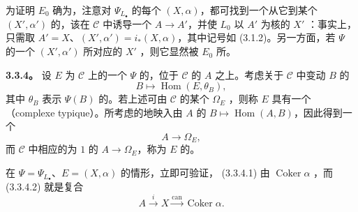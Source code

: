 为证明 $E_0$ 确为，注意对 $\Psi_{L_\bullet}$ 的每个 $(X,\alpha)$，都可找到一个从它到某个 $(X',\alpha')$ 的，该在 $\mathcal C$ 中诱导一个 $A\to A'$，并使 $L_0$ 以 $A'$ 为核的 $X'$ ：事实上，只需取 $A'=X$、$(X',\alpha')=i_*(X,\alpha)$，其中记号如 (3.1.2)。另一方面，若 $\Psi$ 的一个 $(X',\alpha')$ 所对应的 $X'$ ，则它显然被 $E_0$ 所。

\textbf{3.3.4。} 设 $E$ 为 $\mathcal C$ 上的一个 $\Psi$ 的，位于 $\mathcal C$ 的 $A$ 之上。考虑关于 $\mathcal C$ 中变动 $B$ 的
\[
B\longmapsto\operatorname{Hom}(E,\theta_B),\tag{3.3.4.1}
\]
其中 $\theta_B$ 表示 $\Psi(B)$ 的。若上述可由 $\mathcal C$ 的某个 $\Omega_E$ ，则称 $E$ 具有一个（complexe typique）。所考虑的地映入由 $A$ 的 $B\mapsto\operatorname{Hom}(A,B)$，因此得到一个
\[
A\longrightarrow\Omega_E,\tag{3.3.4.2}
\]
而 $\mathcal C$ 中相应的为 $1$ 的 $A\to\Omega_E$，称为 $E$ 的。

在 $\Psi=\Psi_{L_\bullet}$、$E=(X,\alpha)$ 的情形，立即可验证， (3.3.4.1) 由 $\operatorname{Coker}\alpha$ ，而 (3.3.4.2) 就是复合
\[
A\xrightarrow{i}X\xrightarrow{\mathrm{can}}\operatorname{Coker}\alpha.
\]


